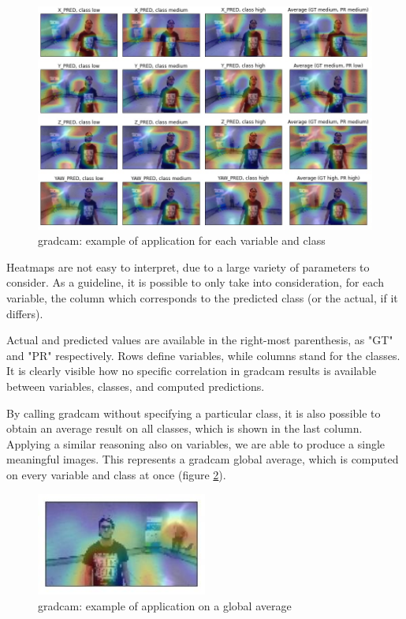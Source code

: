 \begin{figure}[!h]
	\centering
	\includegraphics[width=1\textwidth]{"contents/images/gradcam/04-gradcam-example-1"}
	\caption[\gls{gradcam}: example of application for each variable and class]{\gls{gradcam}: example of application for each variable and class}
	\label{fig:gradcam-example-1}
\end{figure}

Heatmaps are not easy to interpret, due to a large variety of parameters to consider. As a guideline, it is possible to only take into consideration, for each variable, the column which corresponds to the predicted class (or the actual, if it differs).

Actual and predicted values are available in the right-most parenthesis, as "GT" and "PR" respectively. Rows define variables, while columns stand for the classes. It is clearly visible how no specific correlation in \gls{gradcam} results is available between variables, classes, and computed predictions.

By calling \gls{gradcam} without specifying a particular class, it is also possible to obtain an average result on all classes, which is shown in the last column. Applying a similar reasoning also on variables, we are able to produce a single meaningful images. This represents a \gls{gradcam} global average, which is computed on every variable and class at once (figure \ref{fig:gradcam-example-2}).

\begin{figure}[!h]
	\centering
	\includegraphics[width=0.5\textwidth]{"contents/images/gradcam/04-gradcam-example-2"}
	\caption[\gls{gradcam}: example of application on a global average]{\gls{gradcam}: example of application on a global average}
	\label{fig:gradcam-example-2}
\end{figure}




